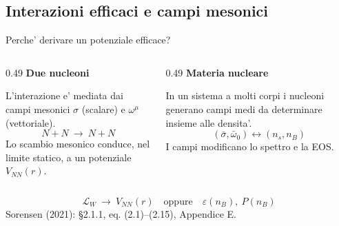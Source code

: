 \subsection{Interazioni efficaci e campi mesonici}

\begin{frame}{Perche' derivare un potenziale efficace?}
\small
\begin{columns}[T,onlytextwidth]
\begin{column}{0.49\textwidth}
\textbf{Due nucleoni}\par\smallskip
L'interazione e' mediata dai campi mesonici
\(\sigma\) (scalare) e \(\omega^\mu\) (vettoriale).
\[
N+N\ \longrightarrow\ N+N
\]
Lo scambio mesonico conduce, nel limite statico,
a un potenziale \(V_{NN}(r)\).
\end{column}
\begin{column}{0.49\textwidth}
\textbf{Materia nucleare}\par\smallskip
In un sistema a molti corpi i nucleoni generano
campi medi da determinare insieme alle densita'.
\[
(\bar\sigma,\bar\omega_0)
\longleftrightarrow (n_s,n_B)
\]
I campi modificano lo spettro e la EOS.
\end{column}
\end{columns}
\medskip
\[
\mathcal L_W\ \longrightarrow\
V_{NN}(r)\quad\text{oppure}\quad
\varepsilon(n_B),\ P(n_B)
\]
\footnotesize
Sorensen (2021): \S 2.1.1, eq. (2.1)--(2.15), Appendice E.
\end{frame}

